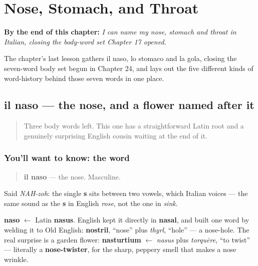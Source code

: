 
\chapter{Nose, Stomach, and Throat}
\label{ch:it-nose-stomach-throat}

\begin{chapteropening}
\textbf{By the end of this chapter:} \emph{I can name my nose, stomach and throat in Italian, closing the body-word set Chapter 17 opened.}

The chapter's last lesson gathers il naso, lo stomaco and la gola, closing the seven-word body set begun in Chapter 24, and lays out the five different kinds of word-history behind those seven words in one place.
\end{chapteropening}

\section[il naso]{il naso — the nose, and a flower named after it}

\label{lesson:IT-C25-naso}



\begin{quote}
Three body words left. This one has a straightforward Latin root and a genuinely surprising English cousin waiting at the end of it.
\end{quote}

\subsection*{You'll want to know: the word}
\begin{quote}
\textbf{il naso} — the nose. Masculine.
\end{quote}

Said \emph{NAH-zoh}: the single \textbf{s} sits between two vowels, which Italian voices — the same sound as the \textbf{s} in English \emph{rose}, not the one in \emph{sink}.

\begin{cousinweb}
\textbf{naso} $\leftarrow$ Latin \textbf{nasus}. English kept it directly in \textbf{nasal}, and built one word by welding it to Old English: \textbf{nostril}, \textquotedblleft{}nose\textquotedblright{} plus \emph{thyrl}, \textquotedblleft{}hole\textquotedblright{} — a nose-hole. The real surprise is a garden flower: \textbf{nasturtium} $\leftarrow$ \emph{nasus} plus \emph{torquēre}, \textquotedblleft{}to twist\textquotedblright{} — literally a \textbf{nose-twister}, for the sharp, peppery smell that makes a nose wrinkle.
\end{cousinweb}

